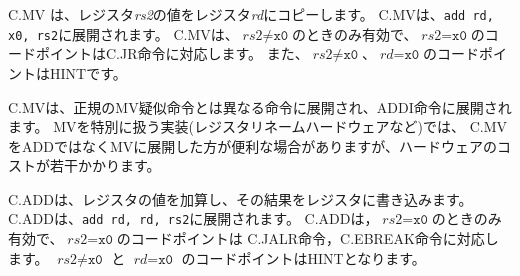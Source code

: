 \begin{comment}
C.MV copies the value in register {\em rs2} into register {\em rd}.  C.MV
expands into {\tt add rd, x0, rs2}.
C.MV is only valid when $\textit{rs2}{\neq}\texttt{x0}$; the code points
with $\textit{rs2}{=}\texttt{x0}$ correspond to the C.JR instruction.
The code points with $\textit{rs2}{\neq}\texttt{x0}$ and
$\textit{rd}{=}\texttt{x0}$ are HINTs.
\end{comment}
C.MV は、レジスタ{\em rs2}の値をレジスタ{\em rd}にコピーします。
C.MVは、{\tt add rd, x0, rs2}に展開されます。
C.MVは、$\textit{rs2}{\neq}\texttt{x0}$のときのみ有効で、$\textit{rs2}{=}\texttt{x0}$のコードポイントはC.JR命令に対応します。
また、$\textit{rs2}{\neq}\texttt{x0}$、$\textit{rd}{=}\texttt{x0}$のコードポイントはHINTです。

\begin{commentary}
\begin{comment}
C.MV expands to a different instruction than the canonical MV
pseudoinstruction, which instead uses ADDI. Implementations that handle MV
specially, e.g. using register-renaming hardware, may find it more convenient
to expand C.MV to MV instead of ADD, at slight additional hardware cost.
\end{comment}
C.MVは、正規のMV疑似命令とは異なる命令に展開され、ADDI命令に展開されます。
MVを特別に扱う実装(レジスタリネームハードウェアなど)では、
C.MVをADDではなくMVに展開した方が便利な場合がありますが、ハードウェアのコストが若干かかります。
\end{commentary}

\begin{comment}
C.ADD adds the values in registers {\em rd} and {\em rs2} and writes the
result to register {\em rd}.  C.ADD expands into {\tt add rd, rd, rs2}.
C.ADD is only valid when $\textit{rs2}{\neq}\texttt{x0}$; the code points
with $\textit{rs2}{=}\texttt{x0}$ correspond to the C.JALR and C.EBREAK instructions.
The code points with $\textit{rs2}{\neq}\texttt{x0}$ and
$\textit{rd}{=}\texttt{x0}$ are HINTs.
\end{comment}
C.ADDは、レジスタの値を加算し、その結果をレジスタに書き込みます。
C.ADDは、{\tt add rd, rd, rs2}に展開されます。
C.ADDは，$\textit{rs2}{=}\texttt{x0}$のときのみ有効で、$\textit{rs2}{=}\texttt{x0}$のコードポイントは
C.JALR命令，C.EBREAK命令に対応します。
$\textit{rs2}{\neq}\texttt{x0}$ と $\textit{rd}{=}\texttt{x0}$ のコードポイントはHINTとなります。

